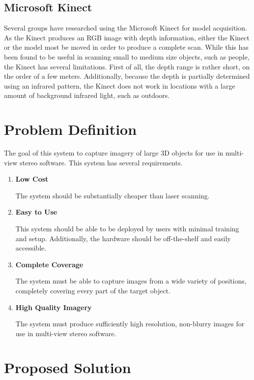 \subsection{Microsoft Kinect}

Several groups have researched using the Microsoft Kinect for model acquisition. As the Kinect produces an RGB image with depth information, either the Kinect or the model most be moved in order to produce a complete scan. While this has been found to be useful in scanning small to medium size objects, such as people, the Kinect has several limitations. First of all, the depth range is rather short, on the order of a few meters. Additionally, because the depth is partially determined using an infrared pattern, the Kinect does not work in locations with a large amount of background infrared light, such as outdoors.


\section{Problem Definition}
The goal of this system to capture imagery of large 3D objects for use in multi-view stereo software. This system has several requirements.

\begin{enumerate}
\item
\textbf{Low Cost}

The system should be substantially cheaper than laser scanning.

\item
\textbf{Easy to Use}

This system should be able to be deployed by users with minimal training and setup. Additionally, the hardware should be off-the-shelf and easily accessible.

\item
\textbf{Complete Coverage}

The system must be able to capture images from a wide variety of positions, completely covering every part of the target object.

\item
\textbf{High Quality Imagery}

The system must produce sufficiently high resolution, non-blurry images for use in multi-view stereo software.

\end{enumerate}

\section{Proposed Solution}

